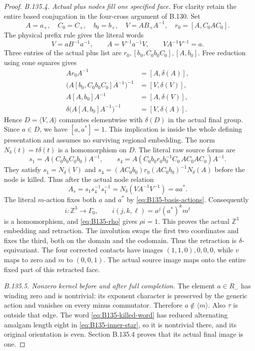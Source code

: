 \begin{proof}
\emph{B.135.4. Actual plus nodes fill one specified face.}
For clarity retain the entire based conjugation in the
four-cross argument of B.130. Set
\[
 A=a_+,\quad C_0=C_+,\quad b_0=b_+,\quad
 V=AB_+A^{-1},\quad r_0=[A,C_0AC_0].
\]
The physical prefix rule gives the literal words
\[
 V=aB^{-1}a^{-1},\qquad A=V^{-1}a^{-1}V,\qquad
 VA^{-1}V^{-1}=a.
\]
Three entries of the actual plus list are
$r_0,[b_0,C_0b_0C_0],[A,b_0]$. Free reduction using cone
squares gives
\begin{equation}\label{eq:B135-four-cross}
 \begin{aligned}
 Ar_0A^{-1}&=[A,\delta(A)],\\
 \bigl(A[b_0,C_0b_0C_0]A^{-1}\bigr)^{-1}
      &=[V,\delta(V)],\\
 A[A,b_0]A^{-1}&=[A,\delta(V)],\\
 \delta\bigl(A[A,b_0]A^{-1}\bigr)^{-1}
      &=[V,\delta(A)].
 \end{aligned}
\end{equation}
Hence $D=\langle V,A\rangle$ commutes elementwise with
$\delta(D)$ in the actual final group. Since $a\in D$,
we have $[a,a^*]=1$. This implication is inside the whole
defining presentation and assumes no surviving regional
embedding. The norm $N_\delta(t)=t\delta(t)$ is a
homomorphism on $D$. The literal raw source forms are
\[
 s_1=A(C_0b_0C_0b_0)A^{-1},\qquad
 s_4=A(C_0b_0r_0b_0^{-1}C_0\,AC_0AC_0)A^{-1}.
\]
They satisfy $s_1=N_\delta(V)$ and
$s_4=(AC_0b_0)r_0(AC_0b_0)^{-1}N_\delta(A)$ before
the node is killed. Thus after the actual node relation
\[
 A_s=s_1s_4^{-1}s_1^{-1}
    =N_\delta(VA^{-1}V^{-1})=aa^*.
\]
The literal $m$-action fixes both $a$ and $a^*$ by
\eqref{eq:B135-basis-actions}. Consequently
\[
 i:\mathbb Z^3\longrightarrow\Gamma_0,\qquad
 i(j,k,\ell)=a^j(a^*)^k m^\ell
\]
is a homomorphism, and \eqref{eq:B135-rho} gives $\rho i=1$.
This proves the actual $\mathbb Z^3$ embedding and retraction.
The involution swaps the first two coordinates and fixes the
third, both on the domain and the codomain. Thus the retraction
is $\delta$-equivariant. The four corrected contacts have
images $(1,1,0),0,0,0$, while $v$ maps to zero and $m$ to
$(0,0,1)$. The actual source image maps onto the entire fixed
part of this retracted face.

\emph{B.135.5. Nonzero kernel before and after full completion.}
The element $a\in R_-$ has winding zero and is nontrivial:
its exponent character is preserved by the generic action
and vanishes on every minus commutator. Therefore
$a\notin\langle m\rangle$. Also $\tau$ is outside that
edge. The word \eqref{eq:B135-killed-word} has reduced
alternating amalgam length eight in \eqref{eq:B135-inner-star},
so it is nontrivial there, and its original orientation is even.
Section B.135.4 proves that its actual final image is one.


\end{proof}
